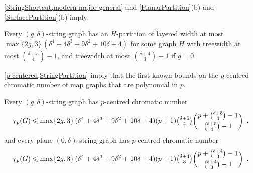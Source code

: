 \documentclass{patmorin}
\newcommand{\PP}{\mathcal{P}}
\renewcommand{\le}{\leqslant}
\begin{document}
%

\cref{StringShortcut,modern-major-general} and \cref{PlanarPartition}(b) and \cref{SurfacePartition}(b) imply:

\begin{thm}
\label{StringPartition}
Every $(g,\delta)$-string graph has an $H$-partition of layered 
width at most $\max\{2g,3\} \,(\delta^4 + 4 \delta^3 + 9 \delta^2 + 10 \delta + 4)$ 
for some graph $H$ with treewidth at most $\binom{ \delta+5}{4}-1$, 
and treewidth at most $\binom{ \delta+4}{3}-1$ if $g=0$. 
%
%
%
\end{thm}


\cref{p-centered,StringPartition} imply that the first known bounds on the $p$-centred chromatic number of map graphs that are polynomial in $p$.

\begin{cor}
Every $(g,\delta)$-string graph has $p$-centred chromatic number  
$$\chi_p(G)\le \max\{2g,3\} \,(\delta^4 + 4 \delta^3 + 9 \delta^2 + 10 \delta + 4) (p+1) 
\tbinom{ \delta+5}{4} \binom{p+\binom{ \delta+5}{4}-1}{\binom{ \delta+5}{4}-1}\enspace,$$
and every plane $(0,\delta)$-string graph has $p$-centred chromatic number  
$$\chi_p(G)\le \max\{2g,3\} \,(\delta^4 + 4 \delta^3 + 9 \delta^2 + 10 \delta + 4) (p+1) 
\tbinom{ \delta+4}{3}\binom{p+\binom{ \delta+4}{3}-1}{\binom{ \delta+4}{3}-1}\enspace.$$
\end{cor}
\end{document}
